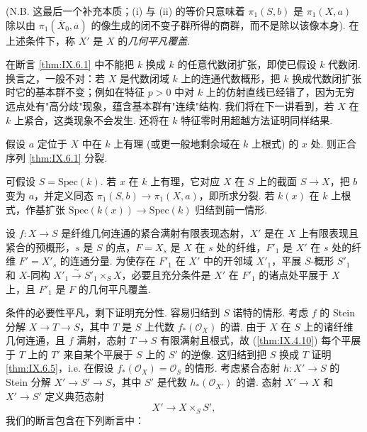 (N.B. 这最后一个补充本质；(i) 与 (ii) 的等价只意味着 $\pi_1(S, b)$ 是 $\pi_1(X, a)$ 除以由 $\pi_1(\overline{X}_0, \overline{a})$ 的像生成的闭不变子群所得的商群，而不是除以该像本身). 在上述条件下，称 $X'$ 是 $X$ 的\emph{几何平凡覆盖}.

\begin{remark}\label{rem:IX.6.3}
在断言 \ref{thm:IX.6.1} 中不能把 $k$ 换成 $k$ 的任意代数闭扩张，即使已假设 $k$ 代数闭. 换言之，一般不对：若 $X$ 是代数闭域 $k$ 上的连通代数概形，把 $k$ 换成代数闭扩张时它的基本群不变；例如在特征 $p > 0$ 中对 $k$ 上的仿射直线已经错了，因为无穷远点处有"高分歧"现象，蕴含基本群有"连续"结构. 我们将在下一讲看到，若 $X$ 在 $k$ 上紧合，这类现象不会发生. 还将在 $k$ 特征零时用超越方法证明同样结果.
\end{remark}

\begin{corollary}\label{cor:IX.6.4}
假设 $a$ 定位于 $X$ 中在 $k$ 上有理 (或更一般地剩余域在 $k$ 上根式) 的 $x$ 处. 则正合序列 \ref{thm:IX.6.1} 分裂.
\end{corollary}

可假设 $S = \mathrm{Spec}(k)$. 若 $x$ 在 $k$ 上有理，它对应 $X$ 在 $S$ 上的截面 $S \to X$，把 $b$ 变为 $a$，并定义同态 $\pi_1(S, b) \to \pi_1(X, a)$，即所求分裂. 若 $k(x)$ 在 $k$ 上根式，作基扩张 $\mathrm{Spec}(k(x)) \to \mathrm{Spec}(k)$ 归结到前一情形.

\begin{theorem}\label{thm:IX.6.5}
设 $f \colon X \to S$ 是纤维几何连通的紧合满射有限表现态射，$X'$ 是在 $X$ 上有限表现且紧合的预概形，$s$ 是 $S$ 的点，$F = X_s$ 是 $X$ 在 $s$ 处的纤维，$F'_1$ 是 $X'$ 在 $s$ 处的纤维 $F' = X'_s$ 的连通分量. 为使存在 $F'_1$ 在 $X'$ 中的开邻域 $X'_1$，平展 $S$-概形 $S'_1$ 和 $X$-同构 $X'_1 \xrightarrow{\sim} S'_1 \times_S X$，必要且充分条件是 $X'$ 在 $F'_1$ 的诸点处平展于 $X$ 上，且 $F'_1$ 是 $F$ 的几何平凡覆盖.
\end{theorem}

条件的必要性平凡，剩下证明充分性. 容易归结到 $S$ 诺特的情形. 考虑 $f$ 的 Stein 分解 $X \to T \to S$，其中 $T$ 是 $S$ 上代数 $f_*(\mathcal{O}_X)$ 的谱. 由于 $X$ 在 $S$ 上的诸纤维几何连通，且 $f$ 满射，态射 $T \to S$ 有限满射且根式，故 (\cref{thm:IX.4.10}) 每个平展于 $T$ 上的 $T'$ 来自某个平展于 $S$ 上的 $S'$ 的逆像. 这归结到把 $S$ 换成 $T$ 证明 \ref{thm:IX.6.5}，i.e. 在假设 $f_*(\mathcal{O}_X) = \mathcal{O}_S$ 的情形. 考虑紧合态射 $h \colon X' \to S$ 的 Stein 分解 $X' \to S' \to S$，其中 $S'$ 是代数 $h_*(\mathcal{O}_{X'})$ 的谱. 态射 $X' \to X$ 和 $X' \to S'$ 定义典范态射
\[
X' \longrightarrow X \times_S S',
\]
我们的断言包含在下列断言中：

